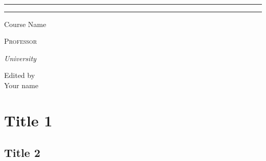 \documentclass{package/notes}
\begin{document}
\begin{titlepage}
\vspace{0.75\baselineskip} %

{\huge {}\\} %

\vspace{0.75\baselineskip} %

\rule{\textwidth}{0.4pt}\vspace*{-\baselineskip}\vspace{3.2pt} %
\rule{\textwidth}{1.6pt} %

\vspace{2\baselineskip} %


\LARGE{Course Name} 

\vspace*{3\baselineskip} %



\vspace{0.5\baselineskip} 

{\scshape   \LARGE Professor\\ } %

\vspace{0.2\baselineskip} 

\textit{\Large University} 

\vfill 



\vspace{0.3\baselineskip} 


{\large Edited by\\  Your name} 
\end{titlepage}
\tableofcontents




\chapter{Title 1}

\section{Title 2}
\end{document}

